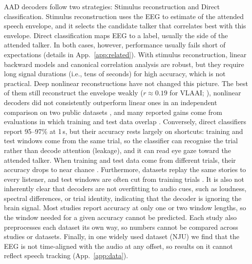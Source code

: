 \documentclass[twoside]{article}
\begin{document}
AAD decoders follow two strategies: Stimulus reconstruction and Direct classification. Stimulus
reconstruction uses the EEG to estimate of the attended speech envelope,  and it selects the candidate
talker that correlates best with this envelope. Direct classification maps EEG to a label, usually the
side of the attended talker. In both cases, however, performance usually fails short of expectations (details in App.~\ref{app:related}). With stimulus reconstruction, linear backward models and canonical correlation analysis \citep{osullivan2015attentional, crosse2016mtrf,decheveigne2018decoding} are robust,
but they require long signal durations (i.e., tens of seconds) for high accuracy, which is not practical. Deep nonlinear reconstructions have not changed this picture. The best of them still
reconstruct the envelope weakly ($r\approx0.19$ for VLAAI; \citealp{accou2023vlaai}), nonlinear
decoders did not consistently outperform linear ones in an independent comparison on two
public datasets \citep{geirnaert2021eeg}, and many reported gains come from evaluations in
which training and test data overlap \citep{puffay2023relating}.
Conversely, direct classifiers \citep{vandecappelle2021eeg, darnet2024, dbpnet2024, listennet2025} report 95--97\% at 1\,s, but their accuracy rests largely on shortcuts: training and test windows come from the same trial, so the classifier can recognise the trial rather than decode attention (leakage), and it can read eye gaze toward the attended talker. When training and test data come from different trials, their accuracy drops to near chance \citep{rotaru2024what}.
Furthermore, datasets replay the same stories to every listener, and test
windows are often cut from training trials \citep{puffay2023relating}. %
It is also not inherently clear that decoders are not overfitting to audio cues, such as loudness, spectral
differences, or trial identity, indicating that the decoder is ignoring the brain signal.%
Most studies report accuracy at only one or two window lengths, so the window needed for a given accuracy cannot be predicted. Each study also preprocesses each dataset its own way, so numbers cannot be compared across studies or datasets. Finally, in one widely used dataset (NJU) we find that the EEG is not time-aligned with the audio at any offset, so results on it cannot reflect speech tracking (App.~\ref{app:data}).
\end{document}
